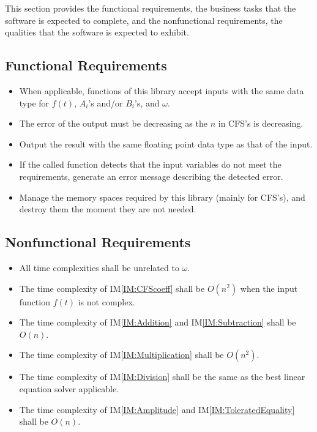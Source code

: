 \documentclass[12pt]{article}
\newcommand{\iref}[1]{IM\ref{#1}}
\newcounter{reqnum} %
\begin{document}
This section provides the functional requirements, the business tasks that the
software is expected to complete, and the nonfunctional requirements, the
qualities that the software is expected to exhibit.

\subsection{Functional Requirements}

\noindent \begin{itemize}
\newcommand{\ritem}[1]{\item[R\refstepcounter{reqnum}\thereqnum \label{R:#1}:]}
\ritem{InputDataType} 
When applicable, functions of this library accept inputs with the same 
data type for $f(t)$, $A_i$'s and/or $B_i$'s, and $\omega$. 
\ritem{OutputError} 
The error of the output must be decreasing as the $n$ in CFS's is decreasing.
\ritem{OutputDataType} 
Output the result with the same floating point data type as that of the input.
\ritem{ErrorMessage}
If the called function detects that the input variables do not 
meet the requirements, generate an error message describing 
the detected error.
\ritem{Memory} 
Manage the memory spaces required by this library 
(mainly for CFS's), and destroy them the moment they are not needed.

\end{itemize}

\subsection{Nonfunctional Requirements}

\begin{itemize}
	\item All time complexities shall be unrelated to $\omega$.
	\item The time complexity of \iref{IM:CFScoeff} shall be $O(n^2)$ 
	when the input function $f(t)$ is not complex.
	\item The time complexity of \iref{IM:Addition} and \iref{IM:Subtraction} 
	shall be $O(n)$.
	\item The time complexity of \iref{IM:Multiplication} shall be $O(n^2)$.
	\item The time complexity of \iref{IM:Division} shall be the same 
	as the best linear equation solver applicable.
	\item The time complexity of \iref{IM:Amplitude} 
	and \iref{IM:ToleratedEquality} shall be $O(n)$.
\end{itemize}
\end{document}
